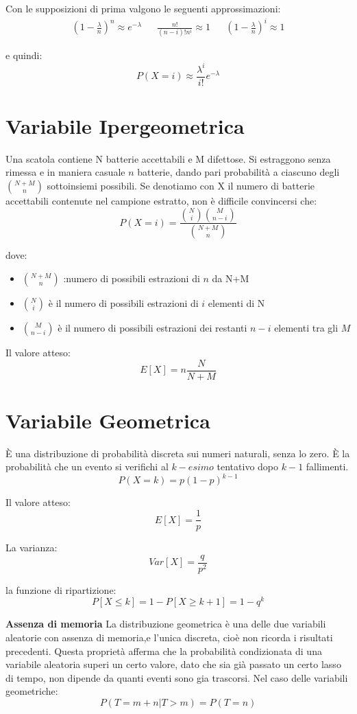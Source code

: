 \documentclass[12pt]{article}
\begin{document}
Con le supposizioni di prima valgono le seguenti approssimazioni:
\begin{align*}
    \left(1-\frac{\lambda}{n}\right)^n \approx e^{-\lambda} & & \frac{n!}{(n-i)!n^i} \approx 1 & & \left(1-\frac{\lambda}{n}\right)^i \approx 1
\end{align*}

e quindi: 
\[
P(X=i) \approx \frac{\lambda^i}{i!}e^{-\lambda}    
\]
\section{Variabile Ipergeometrica}

Una scatola contiene N batterie accettabili e M difettose. Si estraggono senza rimessa e in maniera casuale
\(n\) batterie, dando pari probabilità a ciascuno degli \(\binom{N+M}{n}\) sottoinsiemi possibili. 
Se denotiamo con X il numero di batterie accettabili contenute nel campione estratto, non è difficile convincersi che:
\[
P(X = i) = \frac{\binom{N}{i} \binom{M}{n-i}}{\binom{N+M}{n}}    
\]

dove:
\begin{itemize}
    \item \(\binom{N+M}{n}\) :numero di possibili estrazioni di \(n\) da N+M
    \item \(\binom{N}{i}\) è il numero di possibili estrazioni di \(i\) elementi di N
    \item \(\binom{M}{n-i}\) è il numero di possibili estrazioni dei restanti \(n-i\) elementi tra gli \(M\)
\end{itemize}

Il valore atteso:
\[
E[X] = n\frac{N}{N+M}    
\]

\section{Variabile Geometrica}

È una distribuzione di probabilità discreta sui numeri naturali, senza lo zero. \newline
È la probabilità che un evento si verifichi al \(k-esimo\) tentativo dopo \(k-1\) fallimenti. 
\[
P(X=k) = p(1-p)^{k-1}    
\]

Il valore atteso:
\[
E[X] = \frac{1}{p}    
\]

La varianza:
\[
Var[X] = \frac{q}{p^2}    
\]

la funzione di ripartizione:
\[
P[X \le k] = 1 - P[X \ge k+1] = 1-q^k    
\]

\textbf{Assenza di memoria} \newline
La distribuzione geometrica è una delle due variabili aleatorie con assenza di memoria,e l'unica discreta, cioè non ricorda i risultati
precedenti. 
Questa proprietà afferma che la probabilità condizionata di una variabile aleatoria superi un certo valore, 
dato che sia già passato un certo lasso di tempo, non dipende da quanti eventi sono gia trascorsi. Nel caso 
delle variabili geometriche:
\[
P(T = m +n | T > m) = P(T=n)    
\]
\end{document}
